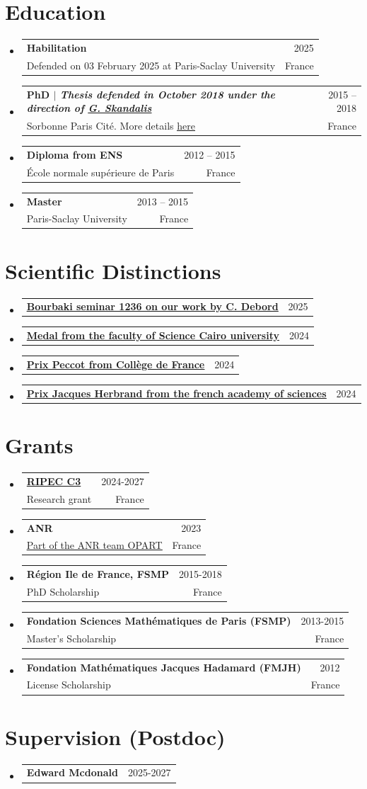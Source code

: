 \documentclass[A4,11pt]{article}
\makeatletter
\newcommand{\CVSubheading}[4]{
  \vspace{-2pt}\item
    \begin{tabular*}{0.97\textwidth}[t]{l@{\extracolsep{\fill}}r}
      \textbf{#1} & #2 \\
      \small#3 & \small #4 \\
    \end{tabular*}\vspace{-7pt}
}
\newcommand{\CVSubheadingshort}[2]{
  \vspace{-2pt}\item
    \begin{tabular*}{0.97\textwidth}[t]{l@{\extracolsep{\fill}}r}
      \textbf{#1} & #2 \\
    \end{tabular*}\vspace{-7pt}
}
\newcommand{\CVSubHeadingListStart}{\begin{itemize}[leftmargin=0.5cm, label={}]}
\newcommand{\CVSubHeadingListEnd}{\end{itemize}}
\makeatother
\begin{document}
\section{Education}
  \CVSubHeadingListStart
   \CVSubheading
      {Habilitation}{2025}
      {Defended on 03 February 2025 at Paris-Saclay University}{France}
    \CVSubheading
      {{PhD $|$ \emph{\small{Thesis defended in October 2018 under the direction of \href{https://webusers.imj-prg.fr/~georges.skandalis/}{\underline{G. Skandalis}}}}}}{2015 -- 2018}
      {Sorbonne Paris Cité. More details \href{https://theses.fr/2018USPCC200}{\underline{here}}}{France}
    \CVSubheading
      {{Diploma from ENS}}{2012 -- 2015}
      {École normale supérieure de Paris}{France}
    \CVSubheading
      {Master}{2013 -- 2015}
      {Paris-Saclay University}{France}
  \CVSubHeadingListEnd
  \section{Scientific Distinctions}
\CVSubHeadingListStart
\CVSubheadingshort{\href{https://www.bourbaki.fr/TEXTES/Exp1236-Debord.pdf}{\underline{Bourbaki seminar 1236 on our work by C. Debord}}}{2025}{}{}
\CVSubheadingshort{\href{}{Medal from the faculty of Science Cairo university}}{2024}{}{}
\CVSubheadingshort{\href{https://www.college-de-france.fr/fr/personne/omar-mohsen}{\underline{Prix Peccot from Collège de France}}}{2024}{}{}
   \CVSubheadingshort{\href{https://www.insmi.cnrs.fr/en/cnrsinfo/prix-academie-des-sciences-2024-mathematiques}{\underline{Prix Jacques Herbrand from the french academy of sciences}}}{2024}{}{}
\CVSubHeadingListEnd
 
\section{Grants}
  \CVSubHeadingListStart
  \CVSubheading
{\href{}{RIPEC C3}}{2024-2027}{Research grant}{France}
\CVSubheading
{ANR}{2023}
{\href{https://anr.fr/Project-ANR-23-CE40-0016}{\underline{Part of the ANR team OPART}}}{France}
    \CVSubheading
      {Région Ile de France, FSMP}{2015-2018}
      {PhD Scholarship}{France}
      \CVSubheading
      {Fondation Sciences Mathématiques de Paris (FSMP)}{2013-2015}
      {Master's Scholarship}{France}
       \CVSubheading
      {Fondation Mathématiques Jacques Hadamard (FMJH)}{2012}
      {License Scholarship}{France}
  \CVSubHeadingListEnd
  \section{Supervision (Postdoc)}
  \CVSubHeadingListStart
  \CVSubheadingshort{Edward Mcdonald}{2025-2027}
  \CVSubHeadingListEnd
\end{document}

